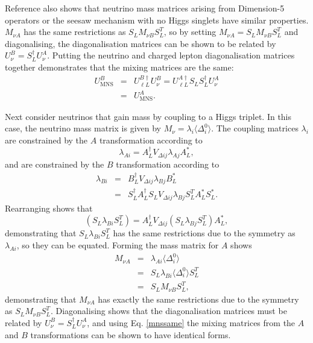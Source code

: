 \documentclass[nofootinbib,showpacs]{revtex4}
\begin{document}
Reference \cite{nogo2} also shows that neutrino mass matrices arising from Dimension-5 operators or the seesaw mechanism with no Higgs singlets have similar properties.  $M_{\nu A}$ has the same restrictions as $S_L M_{\nu B} S_L^T$, so by setting $M_{\nu A}=S_L M_{\nu B} S_L^T$ and diagonalising, the diagonalisation matrices can be shown to be related by  $U_{\nu}^B=S_L^\dagger U_{\nu}^A$. Putting the neutrino and charged lepton diagonalisation matrices together demonstrates that the mixing matrices are the same:
\begin{eqnarray}
U_{\mathrm{MNS}}^B&=&U_{\ell L}^{B \dagger} U_{\nu}^B= U_{\ell L}^{A \dagger} S_L S_L^\dagger U_{\nu}^A\nonumber\\
&=&U_{\mathrm{MNS}}^A.\label{mnssame}
\end{eqnarray} 


Next consider neutrinos that gain mass by coupling to a Higgs triplet.
In this case, the neutrino mass matrix is given by $M_\nu = \lambda_i \langle \Delta^0_i \rangle$.
The coupling matrices $\lambda_i$ are constrained by the $A$ transformation according to
\begin{equation}
\lambda_{A i}=A_L^\dagger V_{\Delta ij} \lambda_{A j} A_L^*,
\end{equation} 
and are constrained by the $B$ transformation according to
\begin{eqnarray}
\lambda_{B i}&=&B_L^\dagger V_{\Delta ij} \lambda_{B j} B_L^*\\
&=&S_L^\dagger A_L^\dagger S_L   V_{\Delta ij} \lambda_{B j} S_L^T A_L^* S_L^*.
\end{eqnarray} 
Rearranging shows that
\begin{equation}
(S_L\lambda_{B i}S_L^T)=A_L^\dagger   V_{\Delta ij} (S_L \lambda_{B j} S_L^T) A_L^*,
\end{equation} 
demonstrating that
$S_L \lambda_{B i} S_L^T$ has the same restrictions due to the symmetry as $\lambda_{A i}$, so they can be equated. 
Forming the mass matrix for $A$ shows
\begin{eqnarray}
M_{\nu A}& =& \lambda_{A i} \langle \Delta^0_i \rangle\\
&=&S_L \lambda_{B i} \langle \Delta^0_i \rangle S_L^T\\
&=&S_L M_{\nu B} S_L^T,
\end{eqnarray}
demonstrating that $M_{\nu A}$ has exactly the same restrictions due to the symmetry as 
$S_L M_{\nu B} S_L^T$. Diagonalising shows that the diagonalisation matrices must be related by $U_{\nu}^B=S_L^\dagger U_{\nu}^A$, and using Eq. \ref{mnssame} the mixing matrices from the $A$ and $B$ transformations can be shown to have identical forms.
\end{document}
